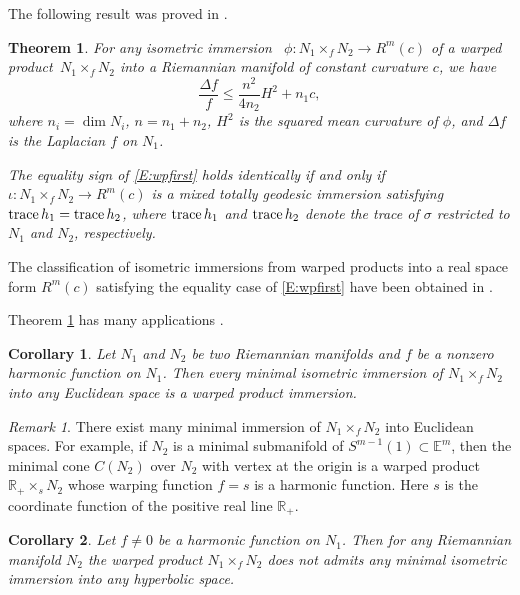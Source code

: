 \documentclass{amsart}
\theoremstyle{plain}
\newtheorem{theorem}{Theorem}[section]
\newtheorem{corollary}{Corollary}[section]
\numberwithin{equation}{section}
\theoremstyle{remark}
\newtheorem{remark}{Remark}[section]
\numberwithin{equation}{section}
\begin{document}
The following result was proved in \cite{c02}.

\begin{theorem}\label{T:3.1} For any  isometric immersion \ $\phi:N_1\times_f N_2\to R^m(c)$ of a warped product $\,N_1\times_f N_2$  into a  Riemannian manifold of
constant curvature $c$, we have
\begin{equation}\label{E:wpfirst} \frac{\Delta f} {f}\leq \frac{n^2}{4n_2}H^2+ n_1c,\end{equation}
 where $n_i=\dim N_i$, $n=n_1+n_2$,  $H^2$ is the squared mean curvature of $\phi$, and $\Delta f$ is the Laplacian $f$ on  $N_1$. 

 The equality sign of \eqref{E:wpfirst}  holds identically if and only if $\iota :N_1\times_f N_2\to R^m(c)$ is a mixed totally geodesic immersion satisfying ${\rm trace}\, h_1={\rm trace}\,h_2$, where ${\rm trace}\, h_1$ and ${\rm trace }\,h_2$ denote the trace of $\sigma$ restricted to $N_1$ and $N_2$, respectively.\end{theorem}  

The classification of isometric immersions from warped products into a real space form $R^m(c)$ satisfying the equality case of  \eqref{E:wpfirst} have been obtained in  \cite{c05-2}.

Theorem \ref{T:3.1} has many applications \cite{c02}. 

\begin{corollary}\label{C:1}  Let $N_1$ and $N_2$ be two Riemannian manifolds and $f$ be a nonzero harmonic  function on  $N_1$. Then every  minimal isometric immersion of $N_1\times_f N_2$ into any Euclidean space is a warped product immersion.
\end{corollary}

\begin{remark} {\rm There exist many minimal immersion of $N_1\times_f N_2$ into Euclidean spaces. For example, if $N_2$ is a minimal submanifold of $S^{m-1}(1)\subset\mathbb E^m$, then the minimal cone $C(N_2)$ over $N_2$ with vertex at the origin is a warped product $\mathbb R_+\times_s N_2$ whose warping function $f=s$ is a harmonic function. Here $s$ is the coordinate function of the positive real line $\mathbb R_+$.}\end{remark} 

\begin{corollary} \label{C:2} Let $f\ne 0$ be a harmonic function on  $N_1$. Then for any Riemannian manifold $N_2$ the warped product $N_1\times_f N_2$ does not admits any  minimal isometric immersion into any hyperbolic space. \end{corollary}
\end{document}
